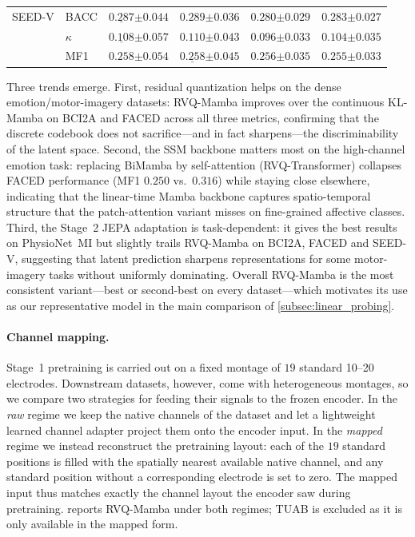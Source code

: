 \documentclass{article}
\begin{document}
\begin{table}[H]
{\begin{tabular}{ll cccc}
    \addlinespace
    SEED-V
      & BACC     & $\underline{0.287}{\scriptstyle\pm0.044}$ & $\mathbf{0.289}{\scriptstyle\pm0.036}$ & $0.280{\scriptstyle\pm0.029}$ & $0.283{\scriptstyle\pm0.027}$ \\
      & $\kappa$ & $\underline{0.108}{\scriptstyle\pm0.057}$ & $\mathbf{0.110}{\scriptstyle\pm0.043}$ & $0.096{\scriptstyle\pm0.033}$ & $0.104{\scriptstyle\pm0.035}$ \\
      & MF1      & $\mathbf{0.258}{\scriptstyle\pm0.054}$ & $\underline{0.258}{\scriptstyle\pm0.045}$ & $0.256{\scriptstyle\pm0.035}$ & $0.255{\scriptstyle\pm0.033}$ \\
    \bottomrule
  \end{tabular}%
  }
\end{table}

Three trends emerge. First, residual quantization helps on the dense
emotion/motor-imagery datasets: RVQ-Mamba improves over the continuous
KL-Mamba on BCI2A and FACED across all three metrics, confirming that the
discrete codebook does not sacrifice---and in fact sharpens---the
discriminability of the latent space. Second, the SSM backbone matters most on
the high-channel emotion task: replacing BiMamba by self-attention
(RVQ-Transformer) collapses FACED performance (MF1 $0.250$ vs.\ $0.316$) while
staying close elsewhere, indicating that the linear-time Mamba backbone
captures spatio-temporal structure that the patch-attention variant misses on
fine-grained affective classes. Third, the Stage~2 JEPA adaptation is
task-dependent: it gives the best results on PhysioNet~MI but slightly trails
RVQ-Mamba on BCI2A, FACED and SEED-V, suggesting that latent prediction sharpens
representations for some motor-imagery tasks without uniformly dominating.
Overall RVQ-Mamba is the most consistent variant---best or second-best on every
dataset---which motivates its use as our representative model in the main
comparison of \cref{subsec:linear_probing}.

\paragraph{Channel mapping.}
Stage~1 pretraining is carried out on a fixed montage of $19$ standard
10--20 electrodes. Downstream datasets, however, come with heterogeneous
montages, so we compare two strategies for feeding their signals to the
frozen encoder. In the \emph{raw} regime we keep the native channels of the
dataset and let a lightweight learned channel adapter project them onto the
encoder input. In the \emph{mapped} regime we instead reconstruct the
pretraining layout: each of the $19$ standard positions is filled with the
spatially nearest available native channel, and any standard position without
a corresponding electrode is set to zero. The mapped input thus matches
exactly the channel layout the encoder saw during pretraining.
 reports RVQ-Mamba under both regimes; TUAB is
excluded as it is only available in the mapped form.
\end{document}
